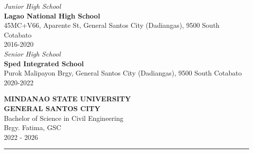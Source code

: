 {\begin{description}[leftmargin=!,labelwidth=4cm]
    \item[Secondary]    \textsl{Junior High School}\\
                        \textbf{Lagao National High School}\\
                        {\small 45MC+V66, Aparente St, General Santos City (Dadiangas), 9500 South Cotabato\\
                        2016-2020}\\[1ex]
                        \textsl{Senior High School}\\
                        \textbf{Sped Integrated School}\\
                        {\small Purok Malipayon Brgy, General Santos City (Dadiangas), 9500 South Cotabato\\
                        2020-2022}
    \item[Tertiary]     \textbf{MINDANAO STATE UNIVERSITY
                        \\GENERAL SANTOS CITY}\\
                        Bachelor of Science in Civil Engineering\\
                        {\small Brgy. Fatima, GSC\\
                        2022 - 2026}
\end{description}
\hrule

}

